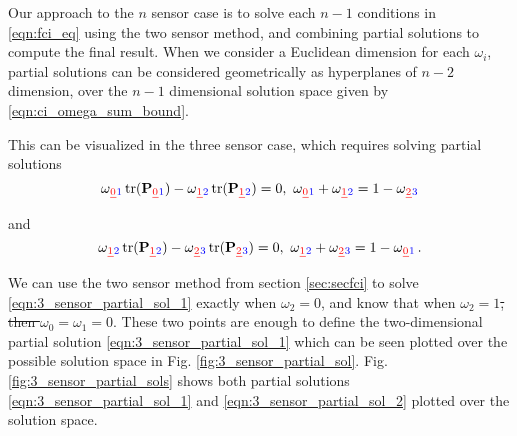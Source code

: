 \documentclass[letterpaper, 10 pt, conference]{ieeeconf}  %
\providecommand{\DIFadd}[1]{{\protect\color{blue}\uwave{#1}}} %
\providecommand{\DIFdel}[1]{{\protect\color{red}\sout{#1}}}                      %
\providecommand{\DIFaddbegin}{} %
\providecommand{\DIFaddend}{} %
\providecommand{\DIFdelbegin}{} %
\providecommand{\DIFdelend}{} %
\begin{document}
Our approach to the $n$ sensor case is to solve each $n-1$ conditions in \eqref{eqn:fci_eq} using the two sensor method, and combining partial solutions to compute the final result. When we consider a Euclidean dimension for each $\omega_i$, partial solutions can be considered geometrically as hyperplanes of $n-2$ dimension, over the $n-1$ dimensional solution space given by \eqref{eqn:ci_omega_sum_bound}. 

This can be visualized in the three sensor case, which requires solving partial solutions
\begin{equation}
   \omega\DIFdelbegin \DIFdel{_0 }\DIFdelend \DIFaddbegin \DIFadd{_1 }\DIFaddend \tr(\mP\DIFdelbegin \DIFdel{_0}\DIFdelend \DIFaddbegin \DIFadd{_1}\DIFaddend ) - \omega\DIFdelbegin \DIFdel{_1 }\DIFdelend \DIFaddbegin \DIFadd{_2 }\DIFaddend \tr(\mP\DIFdelbegin \DIFdel{_1}\DIFdelend \DIFaddbegin \DIFadd{_2}\DIFaddend ) = 0,\ \omega\DIFdelbegin \DIFdel{_0}\DIFdelend \DIFaddbegin \DIFadd{_1}\DIFaddend +\omega\DIFdelbegin \DIFdel{_1}\DIFdelend \DIFaddbegin \DIFadd{_2}\DIFaddend =1-\omega\DIFdelbegin \DIFdel{_2 }\DIFdelend \DIFaddbegin \DIFadd{_3 }\DIFaddend \label{eqn:3_sensor_partial_sol_1}
\end{equation}
and
\begin{equation}
   \omega\DIFdelbegin \DIFdel{_1 }\DIFdelend \DIFaddbegin \DIFadd{_2 }\DIFaddend \tr(\mP\DIFdelbegin \DIFdel{_1}\DIFdelend \DIFaddbegin \DIFadd{_2}\DIFaddend ) - \omega\DIFdelbegin \DIFdel{_2 }\DIFdelend \DIFaddbegin \DIFadd{_3 }\DIFaddend \tr(\mP\DIFdelbegin \DIFdel{_2}\DIFdelend \DIFaddbegin \DIFadd{_3}\DIFaddend ) = 0,\ \omega\DIFdelbegin \DIFdel{_1}\DIFdelend \DIFaddbegin \DIFadd{_2}\DIFaddend +\omega\DIFdelbegin \DIFdel{_2}\DIFdelend \DIFaddbegin \DIFadd{_3}\DIFaddend =1-\omega\DIFdelbegin \DIFdel{_0}\DIFdelend \DIFaddbegin \DIFadd{_1}\DIFaddend \,. \label{eqn:3_sensor_partial_sol_2}
\end{equation}
We can use the two sensor method from section \ref{sec:secfci} to solve \eqref{eqn:3_sensor_partial_sol_1} exactly when \DIFdelbegin \DIFdel{$\omega_2=0$}\DIFdelend \DIFaddbegin \DIFadd{$\omega_3=0$}\DIFaddend , and know that when \DIFdelbegin \DIFdel{$\omega_2=1$, then $\omega_0=\omega_1=0$}\DIFdelend \DIFaddbegin \DIFadd{$\omega_3=1$, then $\omega_1=\omega_2=0$}\DIFaddend . These two points are enough to define the two-dimensional partial solution \eqref{eqn:3_sensor_partial_sol_1} which can be seen plotted over the possible solution space in Fig. \ref{fig:3_sensor_partial_sol}. Fig. \ref{fig:3_sensor_partial_sols} shows both partial solutions \eqref{eqn:3_sensor_partial_sol_1} and \eqref{eqn:3_sensor_partial_sol_2} plotted over the solution space.
\end{document}
